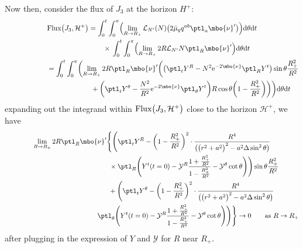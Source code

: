 Now then, consider the flux of $J_3$ at the horizon $H^+$:
\begin{gather*}
{\rm Flux} \bigl(J_3, \mathcal{H}^+\bigr) = \int^t_0 \int^\pi _0 \Bigl(\lim_{R \to R_+} \mathcal{L}_{N'} (N) \bigl(2 \bar{\mu}_q q^{ab} \ptl_a \mbo{\nu}'\bigr) \Bigr) {\rm d}\theta {\rm d}t \notag\\
 \hphantom{{\rm Flux} \bigl(J_3, \mathcal{H}^+\bigr) =}{}
\times{}\int^t_0 \int^\pi_0 \Bigl(\lim_{R \to R_+} 2 R \mathcal{L}_{N'} N \ptl_R \mbo{\nu}' \Bigr) {\rm d}\theta {\rm d}t \notag\\
 \hphantom{{\rm Flux} \bigl(J_3, \mathcal{H}^+\bigr)}{}
= \int^t_0 \int^\pi _0 \biggl(\lim_{R \to R_+} 2 R \ptl_R \mbo{\nu}' \biggl(\bigl(\ptl_t Y^R - N^2 {\rm e}^{-2 \mbo{\nu}} \ptl_R Y^t\bigr) \sin \theta \frac{R^2_+}{R^2} \notag\\
 \hphantom{{\rm Flux} \bigl(J_3, \mathcal{H}^+\bigr)= \int^t_0 \int^\pi _0 \biggl(}{}
 + \biggl(\ptl_t Y^\theta - \frac{N^2}{R^2} {\rm e}^{-2 \mbo{\nu}} \ptl_\theta Y^t\biggr) R \cos \theta \biggl(1-\frac{R^2_+}{R^2}\biggr) \biggr) \biggr) {\rm d}\theta {\rm d}t
\end{gather*}
expanding out the integrand within $ {\rm Flux} \bigl(J_3, \mathcal{H}^+\bigr)$ close to the horizon $\mathcal{H}^+$, we have
\begin{gather*}
 \lim_{R \to R_+} 2R \ptl_R \mbo{\nu}' \Bigg\{ \Biggl(\ptl_t Y^R - \biggl(1 - \frac{R^2_+}{R^2} \biggr)^2 \cdot \frac{R^4}{ \bigl(\bigl(r^2+a^2\bigr)^2 -a^2 \Delta \sin^2 \theta\bigr)} \\
 \hphantom{\lim_{R \to R_+} 2R \ptl_R \mbo{\nu}' \Bigg\{\Biggl(}{}
 \times \ptl_R \Biggl(Y^t(t=0) - \mathcal{Y}^R \frac{1+ \frac{R^2_+}{R^2}}{1-\frac{R^2_+}{R^2}} - \mathcal{Y}^\theta \cot \theta \Biggr) \Biggr)\sin \theta \frac{R^2_+}{R^2} \notag\\
\hphantom{\lim_{R \to R_+} 2R \ptl_R \mbo{\nu}' \Bigg\{ }{}
 + \Biggl( \ptl_t Y^\theta - \biggl(1- \frac{R^2_+}{R^2}\biggr)^2 \cdot \frac{R^4}{ \bigl(\bigl(r^2+a^2\bigr)^2 -a^2 \Delta
	\sin^2 \theta \bigr)} \notag\\
\hphantom{\lim_{R \to R_+} 2R \ptl_R \mbo{\nu}' \Bigg\{ + \Biggl(}{}
 \ptl_\theta \Biggl(Y^t (t=0) - \mathcal{Y}^R \frac{1 + \frac{R^2_+}{R^2}} {{1-\frac{R^2_+}{R^2}} } - \mathcal{Y}^ \theta \cot \theta \Biggr) \Biggr) \Bigg\} \to 0 \qquad \text{as} \ R \to R_+
\end{gather*}
after plugging in the expression of $Y$ and $\mathcal{Y}$ for $R$ near $R_+$.
